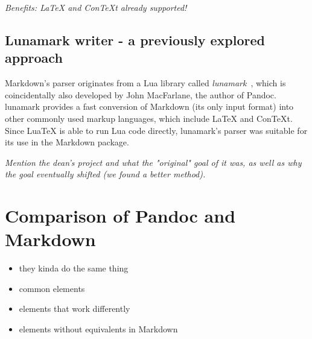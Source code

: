 \documentclass[
  digital,     %
  oneside,     %
  nosansbold,  %
  nocolorbold, %
  lof,         %
  lot,         %
]{fithesis4}
\let\oldlooseness=\looseness
\newcommand{\macro}[1]{\texttt{\textbackslash{}{#1}}}
\begin{document}


\emph{Benefits: \LaTeX{} and Con\TeX{}t already supported!}

\subsection{Lunamark writer - a previously explored approach}
Markdown's parser originates from a Lua library called \emph{lunamark}~\cite{lunamark}, which is coincidentally also developed by John MacFarlane, the author of Pandoc. lunamark provides a fast conversion of Markdown (its only input format) into other commonly used markup languages, which include \LaTeX{} and Con\TeX{}t. Since Lua\TeX{} is able to run Lua code directly, lunamark's parser was suitable for its use in the Markdown package.

\emph{Mention the dean's project and what the "original" goal of it was, as well as why the goal eventually shifted (we found a better method).}

\section{Comparison of Pandoc and Markdown}

\begin{itemize}
\item they kinda do the same thing
\item common elements
\item elements that work differently
\item elements without equivalents in Markdown
\end{itemize}
\end{document}
